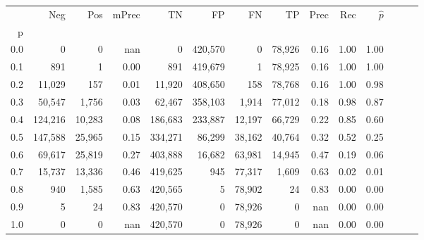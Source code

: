 \begin{tabular}{rrrrrrrrrrrrrr}
\toprule
{} &      Neg &     Pos & mPrec &       TN &       FP &      FN &      TP &  Prec &   Rec & $\hat{p}$ \\
p   &          &         &       &          &          &         &         &       &       &           \\
\midrule
0.0 &        0 &       0 &   nan &        0 &  420,570 &       0 &  78,926 &  0.16 &  1.00 &      1.00 \\
0.1 &      891 &       1 &  0.00 &      891 &  419,679 &       1 &  78,925 &  0.16 &  1.00 &      1.00 \\
0.2 &   11,029 &     157 &  0.01 &   11,920 &  408,650 &     158 &  78,768 &  0.16 &  1.00 &      0.98 \\
0.3 &   50,547 &   1,756 &  0.03 &   62,467 &  358,103 &   1,914 &  77,012 &  0.18 &  0.98 &      0.87 \\
0.4 &  124,216 &  10,283 &  0.08 &  186,683 &  233,887 &  12,197 &  66,729 &  0.22 &  0.85 &      0.60 \\
0.5 &  147,588 &  25,965 &  0.15 &  334,271 &   86,299 &  38,162 &  40,764 &  0.32 &  0.52 &      0.25 \\
0.6 &   69,617 &  25,819 &  0.27 &  403,888 &   16,682 &  63,981 &  14,945 &  0.47 &  0.19 &      0.06 \\
0.7 &   15,737 &  13,336 &  0.46 &  419,625 &      945 &  77,317 &   1,609 &  0.63 &  0.02 &      0.01 \\
0.8 &      940 &   1,585 &  0.63 &  420,565 &        5 &  78,902 &      24 &  0.83 &  0.00 &      0.00 \\
0.9 &        5 &      24 &  0.83 &  420,570 &        0 &  78,926 &       0 &   nan &  0.00 &      0.00 \\
1.0 &        0 &       0 &   nan &  420,570 &        0 &  78,926 &       0 &   nan &  0.00 &      0.00 \\
\bottomrule
\end{tabular}
